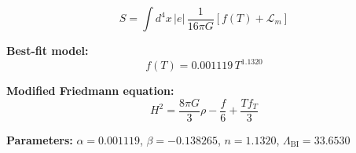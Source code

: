
\begin{equation}
  S = \int d^4x \, |e| \, \frac{1}{16\pi G} \left[ f(T) + \mathcal{L}_m \right]
\end{equation}

\textbf{Best-fit model:}
\begin{equation}
  f(T) = 0.001119 \, T^{1.1320}
\end{equation}

\textbf{Modified Friedmann equation:}
\begin{equation}
  H^2 = \frac{8\pi G}{3} \rho - \frac{f}{6} + \frac{T f_T}{3}
\end{equation}

\textbf{Parameters:}
$\alpha = 0.001119$, \quad
$\beta = -0.138265$, \quad
$n = 1.1320$, \quad
$\Lambda_{\text{BI}} = 33.6530$